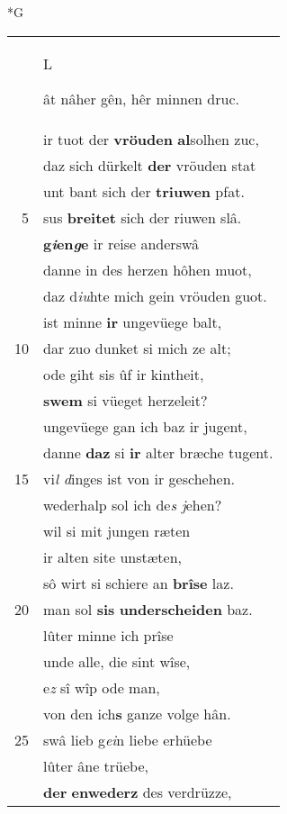 \documentclass[8pt,a4paper,notitlepage]{article}
\begin{document}
\newpage
\begin{table}[ht]
\begin{minipage}[t]{0.5\linewidth}
\small
\begin{center}*G
\end{center}
\begin{tabular}{rl}
 & \begin{large}L\end{large}ât nâher gên, hêr minnen druc.\\ 
 & ir tuot der \textbf{vröuden} \textbf{al}solhen zuc,\\ 
 & daz sich dürkelt \textbf{der} vröuden stat\\ 
 & unt bant sich der \textbf{triuwen} pfat.\\ 
5 & sus \textbf{breitet} sich der riuwen slâ.\\ 
 & \textbf{g\textit{i}en\textit{g}e} ir reise anderswâ\\ 
 & danne in des herzen hôhen muot,\\ 
 & daz d\textit{iu}hte mich gein vröuden guot.\\ 
 & ist minne \textbf{ir} ungevüege balt,\\ 
10 & dar zuo dunket si mich ze alt;\\ 
 & ode giht sis ûf ir kintheit,\\ 
 & \textbf{swem} si vüeget herzeleit?\\ 
 & ungevüege gan ich baz ir jugent,\\ 
 & danne \textbf{daz} si \textbf{ir} alter bræche tugent.\\ 
15 & vi\textit{l d}inges ist von ir geschehen.\\ 
 & wederhalp sol ich de\textit{s j}ehen?\\ 
 & wil si mit jungen ræten\\ 
 & ir alten site unstæten,\\ 
 & sô wirt si schiere an \textbf{brîse} laz.\\ 
20 & man sol \textbf{sis} \textbf{underscheiden} baz.\\ 
 & lûter minne ich prîse\\ 
 & unde alle, die sint wîse,\\ 
 & e\textit{z} sî wîp ode man,\\ 
 & von den ich\textbf{s} ganze volge hân.\\ 
25 & swâ lieb g\textit{ei}n liebe erhüebe\\ 
 & lûter âne trüebe,\\ 
 & \textbf{der} \textbf{enwederz} des verdrüzze,\\ 

\end{tabular}
\end{minipage}
\end{table}
\end{document}

